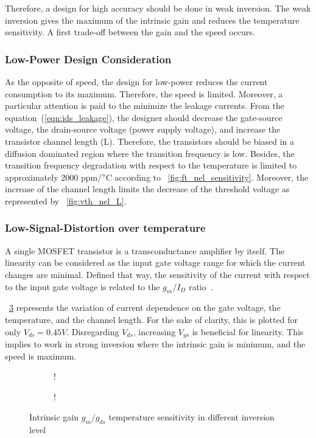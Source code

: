 Therefore, a design for high accuracy should be done in weak inversion. The weak inversion gives the maximum of the intrinsic gain and reduces the temperature sensitivity. A first trade-off between the gain and the speed occurs.

\subsubsection{Low-Power Design Consideration}
As the opposite of speed, the design for low-power reduces the current consumption to its maximum. Therefore, the speed is limited. Moreover, a particular attention is paid to the minimize the leakage currents. From the equation~(\ref{eqn:ids_leakage}), the designer should decrease the gate-source voltage, the drain-source voltage (power supply voltage), and increase the transistor channel length (L). Therefore, the transistors should be biased in a diffusion dominated region where the transition frequency is low. Besides, the transition frequency degradation with respect to the temperature is limited to approximately 2000 ppm/\(\degree \)C according to \figurename~\ref{fig:ft_nel_sensitivity}. Moreover, the increase of the channel length limits the decrease of the threshold voltage as represented by \figurename~\ref{fig:vth_nel_L}.

\subsubsection{Low-Signal-Distortion over temperature}
A single MOSFET transistor is a transconductance amplifier by itself. The linearity can be considered as the input gate voltage range for which the current changes are minimal. Defined that way, the sensitivity of the current with respect to the input gate voltage is related to the \(g_m/I_D \) ratio~\cite{Ou2018a,Ou2017a}.

\figurename~\ref{fig:gm_id} represents the variation of current dependence on the gate voltage, the temperature, and the channel length. For the sake of clarity, this is plotted for only \(V_{ds} = 0.45 V\). Disregarding \(V_{ds}\), increasing \(V_{gs}\) is beneficial for linearity. This implies to work in strong inversion where the intrinsic gain is minimum, and the speed is maximum. 
\begin{figure}[!ht]
	\centering
	\begin{subfigure}[b]{0.48\textwidth}
		\resizebox {\textwidth} {!} { 
			
		}
		\label{fig:gm_nel_T}
	\end{subfigure}
	\begin{subfigure}[b]{0.48\textwidth}
		\resizebox {\textwidth} {!} { 
			
		}
		\label{fig:gm_nel_L}
	\end{subfigure}
	\caption{Intrinsic gain \(g_m/g_{ds} \) temperature sensitivity in different inversion level}
	\label{fig:gm_id}
\end{figure}

